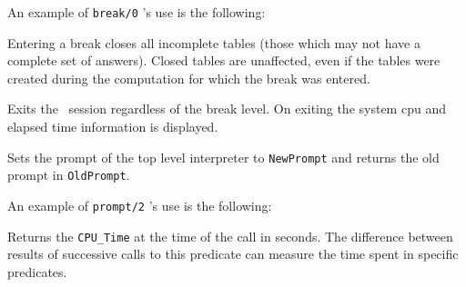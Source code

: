 \begin{description}
    An example of {\tt break/0} 's use is the following:


    Entering a break closes all incomplete tables (those which may not have a 
    complete set of answers).  Closed tables are unaffected, even if 
    the tables were created during the computation for which the break was
    entered.

    Exits the \ourprolog\ session regardless of the break level.  On exiting
    the system cpu and elapsed time information is displayed.

    Sets the prompt of the top level interpreter to {\tt NewPrompt} and 
    returns the old prompt in {\tt OldPrompt}.

    An example of {\tt prompt/2} 's use is the following:

 
    Returns the {\tt CPU\_Time} at the time of the call in seconds. 
    The difference between results of successive calls to this
    predicate can measure the time spent in specific predicates.


\end{description}
